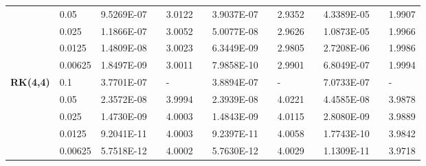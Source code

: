\begin{table}[H]
\begin{tabular}{lllllrlrlrlrlrl}
	\multicolumn{2}{l}{} & \multicolumn{2}{l}{0.05} & 9.5269E-07 &       & 3.0122  &       & 3.9037E-07 &       & 2.9352  &       & 4.3389E-05 &       & 1.9907  \\
	\multicolumn{2}{l}{} & \multicolumn{2}{l}{0.025} & 1.1866E-07 &       & 3.0052  &       & 5.0077E-08 &       & 2.9626  &       & 1.0873E-05 &       & 1.9966  \\
	\multicolumn{2}{l}{} & \multicolumn{2}{l}{0.0125} & 1.4809E-08 &       & 3.0023  &       & 6.3449E-09 &       & 2.9805  &       & 2.7208E-06 &       & 1.9986  \\
	\multicolumn{2}{l}{} & \multicolumn{2}{l}{0.00625} & 1.8497E-09 &       & 3.0011  &       & 7.9858E-10 &       & 2.9901  &       & 6.8049E-07 &       & 1.9994  \\
	\multicolumn{2}{l}{\multirow{5}[1]{*}{\textbf{RK(4,4)}}} & \multicolumn{2}{l}{0.1} & 3.7701E-07 &       & -     &       & 3.8894E-07 &       & -     &       & 7.0733E-07 &       & - \\
	\multicolumn{2}{l}{} & \multicolumn{2}{l}{0.05} & 2.3572E-08 &       & 3.9994  &       & 2.3939E-08 &       & 4.0221  &       & 4.4585E-08 &       & 3.9878  \\
	\multicolumn{2}{l}{} & \multicolumn{2}{l}{0.025} & 1.4730E-09 &       & 4.0003  &       & 1.4843E-09 &       & 4.0115  &       & 2.8080E-09 &       & 3.9889  \\
	\multicolumn{2}{l}{} & \multicolumn{2}{l}{0.0125} & 9.2041E-11 &       & 4.0003  &       & 9.2397E-11 &       & 4.0058  &       & 1.7743E-10 &       & 3.9842  \\
	\multicolumn{2}{l}{} & \multicolumn{2}{l}{0.00625} & 5.7518E-12 &       & 4.0002  &       & 5.7630E-12 &       & 4.0029  &       & 1.1309E-11 &       & 3.9718  \\
	\bottomrule
	  \end{tabular}%
	\label{tab:6-1}%
  \end{table}%
  
